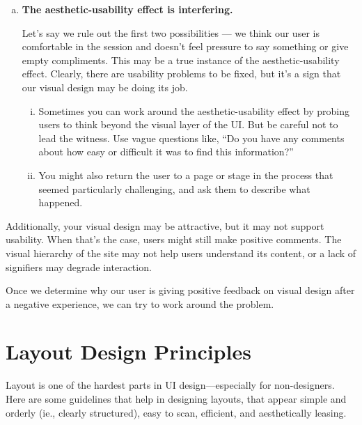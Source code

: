 \begin{enumerate}[a)]
	
	
	\item \textbf{The aesthetic-usability effect is interfering.} \par Let’s say we rule out the first two possibilities — we think our user is comfortable in the session and doesn’t feel pressure to say something or give empty compliments. This may be a true instance of the aesthetic-usability effect. Clearly, there are usability problems to be fixed, but it’s a sign that our visual design may be doing its job.
	\begin{enumerate}[(i)]
		\item Sometimes you can work around the aesthetic-usability effect by probing users to think beyond the visual layer of the UI. But be careful not to lead the witness. Use vague questions like, “Do you have any comments about how easy or difficult it was to find this information?”

		\item You might also return the user to a page or stage in the process that seemed particularly challenging, and ask them to describe what happened.
	\end{enumerate}
\end{enumerate}

Additionally, your visual design may be attractive, but it may not support usability. When that’s the case, users might still make positive comments. The visual hierarchy of the site may not help users understand its content, or a lack of signifiers may degrade interaction.

Once we determine why our user is giving positive feedback on visual design after a negative experience, we can try to work around the problem.







\section{Layout Design Principles} %
\label{sub:layout_design_principles}
Layout is one of the hardest parts in UI design---especially for non-designers.
Here are some guidelines that help in designing layouts, that appear simple and orderly (ie., clearly structured), easy to scan, efficient, and aesthetically leasing.

